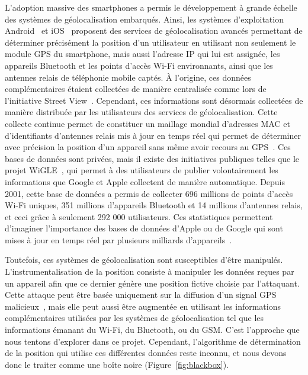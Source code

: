 \documentclass[runningheads]{llncs}
\begin{document}
L'adoption massive des smartphones a permis le développement à grande échelle des systèmes de géolocalisation embarqués. Ainsi, les systèmes d'exploitation Android~\cite{google_how_2020} et iOS~\cite{apple_location_2020} proposent des services de géolocalisation avancés permettant de déterminer précisément la position d'un utilisateur en utilisant non seulement le module GPS du smartphone, mais aussi l'adresse IP qui lui est assignée, les appareils Bluetooth et les points d'accès Wi-Fi environnants, ainsi que les antennes relais de téléphonie mobile captés. À l'origine, ces données complémentaires étaient collectées de manière centralisée comme lors de l'initiative Street View~\cite{peter_fleischer_data_2010}. 
Cependant, ces informations sont désormais collectées de manière distribuée par les utilisateurs des services de géolocalisation. Cette collecte continue permet de constituer un maillage mondial d'adresses MAC et d'identifiants d'antennes relais mis à jour en temps réel qui permet de déterminer avec précision la position d'un appareil sans même avoir recours au GPS~\cite{google_overview_2020}.
Ces bases de données sont privées, mais il existe des initiatives publiques telles que le projet WiGLE~\cite{bobzilla_wigle_2020}, qui permet à des utilisateurs de publier volontairement les informations que Google et Apple collectent de manière automatique. Depuis 2001, cette base de données a permis de collecter 696 millions de points d'accès Wi-Fi uniques, 351 millions d'appareils Bluetooth et 14 millions d'antennes relais, et ceci grâce à seulement 292 000 utilisateurs. Ces statistiques permettent d'imaginer l'importance des bases de données d'Apple ou de Google qui sont mises à jour en temps réel par plusieurs milliards d'appareils~\cite{google_google_2019}.

\begin{sloppypar}
Toutefois, ces systèmes de géolocalisation sont susceptibles d'être manipulés. L'instrumentalisation de la position consiste à manipuler les données reçues par un appareil afin que ce dernier génère une position fictive choisie par l'attaquant. Cette attaque peut être basée uniquement sur la diffusion d'un signal GPS malicieux~\cite{huang_low-cost_2015,liu_all_2018}, mais elle peut aussi être augmentée en utilisant les informations complémentaires utilisées par les systèmes de géolocalisation tel que les informations émanant du Wi-Fi, du Bluetooth, ou du GSM. C'est l'approche que nous tentons d'explorer dans ce projet. Cependant, l'algorithme de détermination de la position qui utilise ces différentes données reste inconnu, et nous devons donc le traiter comme une boîte noire (Figure~\ref{fig:blackbox}).
\end{sloppypar}
\end{document}
